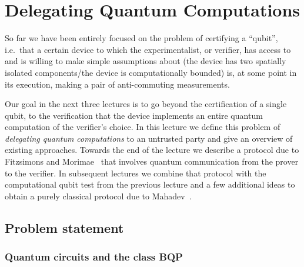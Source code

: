 \chapter{Delegating Quantum Computations}


So far we have been entirely focused on the problem of certifying a ``qubit'', i.e.\ that a certain device to which the experimentalist, or verifier, has access to and is willing to make simple assumptions about (the device has two spatially isolated components/the device is computationally bounded) is, at some point in its execution, making a pair of anti-commuting measurements. 

Our goal in the next three lectures is to go beyond the certification of a single qubit, to the verification that the device implements an entire quantum computation of the verifier's choice. In this lecture we define this problem of \emph{delegating quantum computations} to an untrusted party and give an overview of existing approaches. Towards the end of the lecture we describe a protocol due to Fitzsimons and Morimae~\cite{morimae2016post} that involves quantum communication from the prover to the verifier. In subsequent lectures we combine that protocol with the computational qubit test from the previous lecture and a few additional ideas to obtain a purely classical protocol due to Mahadev~\cite{mahadev2018classical}.  


\section{Problem statement}
\label{sec:delegation-definitions}

\subsection{Quantum circuits and the class BQP}


